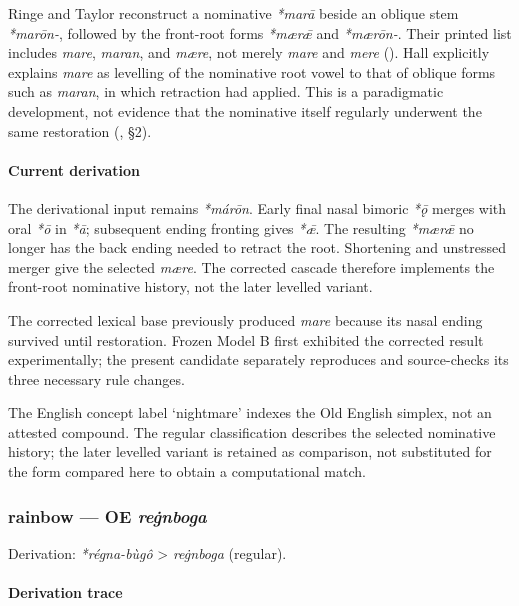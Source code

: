 \documentclass[
  british,
  a4paper,
]{article}
\begin{document}
Ringe and Taylor reconstruct a nominative \emph{*marā} beside an oblique
stem \emph{*marōn-}, followed by the front-root forms \emph{*mærǣ} and
\emph{*mærōn-}. Their printed list includes \emph{mare}, \emph{maran},
and \emph{mære}, not merely \emph{mare} and \emph{mere}
(). Hall
explicitly explains \emph{mare} as levelling of the nominative root
vowel to that of oblique forms such as \emph{maran}, in which retraction
had applied. This is a paradigmatic development, not evidence that the
nominative itself regularly underwent the same restoration
(, §2).

\paragraph{Current derivation}\label{current-derivation}

The derivational input remains \emph{*márōn}. Early final nasal bimoric
\emph{*ǭ} merges with oral \emph{*ō} in \emph{*ā}; subsequent ending
fronting gives \emph{*ǣ}. The resulting \emph{*mærǣ} no longer has the
back ending needed to retract the root. Shortening and unstressed merger
give the selected \emph{mære}. The corrected cascade therefore
implements the front-root nominative history, not the later levelled
variant.

The corrected lexical base previously produced \emph{mare} because its
nasal ending survived until restoration. Frozen Model B first exhibited
the corrected result experimentally; the present candidate separately
reproduces and source-checks its three necessary rule changes.

The English concept label `nightmare' indexes the Old English simplex,
not an attested compound. The regular classification describes the
selected nominative history; the later levelled variant is retained as
comparison, not substituted for the form compared here to obtain a
computational match.

\subsubsection{\texorpdfstring{rainbow --- OE
\emph{reġnboga}}{rainbow --- OE reġnboga}}\label{rainbow-oe-reux121nboga}

Derivation: \emph{*régna-bùgô} \textgreater{} \emph{reġnboga} (regular).

\paragraph{Derivation trace}\label{derivation-trace-65}
\end{document}
